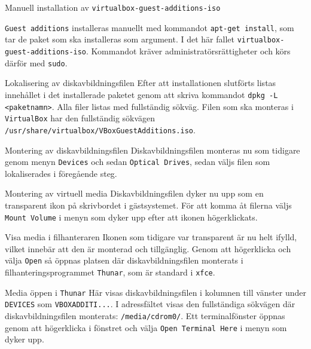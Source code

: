            {Manuell installation av \texttt{virtualbox-guest-additions-iso}
           {\texttt{Guest additions} installeras manuellt med kommandot
            \texttt{apt-get install}, som tar de paket som ska installeras som
            argument. I det här fallet \texttt{virtualbox-guest-additions-iso}.
            Kommandot kräver administratörsrättigheter och körs därför med
            \texttt{sudo}.
           {}

           {Lokalisering av diskavbildningsfilen}
           {Efter att installationen slutförts listas innehållet i det
            installerade paketet genom att skriva kommandot \texttt{dpkg -L
            <paketnamn>}.  Alla filer listas med fullständig sökväg. Filen som
            ska monteras i \texttt{VirtualBox} har den fullständig sökvägen
            \texttt{/usr/share/virtualbox/VBoxGuestAdditions.iso}.}
           {}

           {Montering av diskavbildningsfilen}
           {Diskavbildningsfilen monteras nu som tidigare genom menyn
            \texttt{Devices} och sedan \texttt{Optical Drives}, sedan väljs
            filen som lokaliserades i föregående steg.}
           {}

           {Montering av virtuell media}
           {Diskavbildningsfilen dyker nu upp som en transparent ikon på
            skrivbordet i gästsystemet. För att komma åt filerna väljs
            \texttt{Mount Volume} i menyn som dyker upp efter att ikonen
            högerklickats.}
           {}

           {Visa media i filhanteraren}
           {Ikonen som tidigare var transparent är nu helt ifylld, vilket
            innebär att den är monterad och tillgänglig. Genom att högerklicka
            och välja \texttt{Open} så öppnas platsen där diskavbildningsfilen
            monterats i filhanteringsprogrammet \texttt{Thunar}, som är 
            standard i \texttt{xfce}.}
           {}

           {Media öppen i \texttt{Thunar}}
           {Här visas diskavbildningsfilen i kolumnen till vänster under
            \texttt{DEVICES} som \texttt{VBOXADDITI...}. I adressfältet visas
            den fullständiga sökvägen där diskavbildningsfilen monterats:
            \texttt{/media/cdrom0/}. Ett terminalfönster öppnas genom att
            högerklicka i fönstret och välja \texttt{Open Terminal Here} i
            menyn som dyker upp.}
           {}

}}

